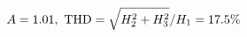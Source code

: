 \documentclass[preview]{standalone}
\begin{document}
\begin{align*}
\special{dvisvgm:raw <g id='unique000'>}A=1.01,\ \text{THD}=\sqrt{H_2^2+H_3^2}/H_1=17.5\%\special{dvisvgm:raw </g>}
\end{align*}
\end{document}
